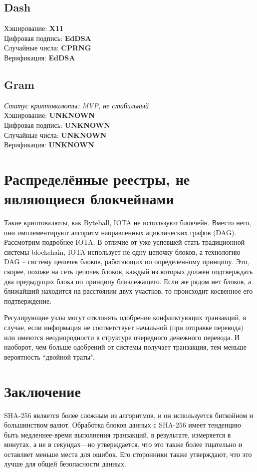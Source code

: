 \documentclass[russian, a4paper, 12pt]{article}
\begin{document}
\subsection{Dash}
Хэширование: \textbf{X11}\\
Цифровая подпись: \textbf{EdDSA}\\
Случайные числа: \textbf{CPRNG}\\
Верификация: \textbf{EdDSA}\\

\subsection{Gram}
\textit{Статус криптовалюты: MVP, не стабильный}\\
Хэширование: \textbf{UNKNOWN}\\
Цифровая подпись: \textbf{UNKNOWN}\\
Случайные числа: \textbf{UNKNOWN}\\
Верификация: \textbf{UNKNOWN}\\

\section{Распределённые реестры, не являющиеся блокчейнами}
Такие криптовалюты, как Byteball, IOTA не используют блокчейн. Вместо него, они
имплементируют алгоритм направленных ациклических графов (DAG).  Рассмотрим
подробнее IOTA. В отличие от уже успевшей стать традиционной системы
blockchain, IOTA использует не одну цепочку блоков, а технологию DAG – систему
цепочек блоков, работающих по определенному принципу. Это, скорее, похоже на
сеть цепочек блоков, каждый из которых должен подтверждать два предыдущих блока
по принципу близлежащего. Если же рядом нет блоков, а ближайший находится на
расстоянии двух участков, то происходит косвенное его подтверждение.

Регулирующие узлы могут отклонять одобрение конфликтующих транзакций, в случае,
если информация не соответствует начальной (при отправке перевода) или имеются
неоднородности в структуре очередного денежного перевода. И наоборот, чем
больше одобрений от системы получает транзакция, тем меньше вероятность
``двойной траты''.


\section{Заключение}
SHA-256 является более сложным из алгоритмов, и он используется биткойном и
большинством валют. Обработка блоков данных с SHA-256 имеет тенденцию быть
медленнее-время выполнения транзакций, в результате, измеряется в минутах, а не
в секундах—но утверждается, что это также более тщательно и оставляет меньше
места для ошибок. Его сторонники также утверждают, что это лучше для общей
безопасности данных.
\end{document}
